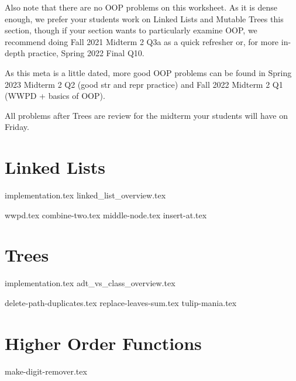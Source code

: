 \documentclass{exam}
\begin{document}
\begin{meta}
    Also note that there are no OOP problems on this worksheet. As it is dense enough, we prefer your students work on Linked Lists and Mutable Trees this section, though if your section wants to particularly examine OOP, we recommend doing Fall 2021 Midterm 2 Q3a as a quick refresher or, for more in-depth practice, Spring 2022 Final Q10.
    
    As this meta is a little dated, more good OOP problems can be found in Spring 2023 Midterm 2 Q2 (good str and repr practice) and Fall 2022 Midterm 2 Q1 (WWPD + basics of OOP).
    
    All problems after Trees are review for the midterm your students will have on Friday.
\end{meta}

\section{Linked Lists}
    {implementation.tex}
    {linked_list_overview.tex}
\begin{questions}
    {wwpd.tex}
    {combine-two.tex}
    {middle-node.tex}
    \newpage
    {insert-at.tex}
\end{questions}

\newpage
\section{Trees}
{implementation.tex}
{adt_vs_class_overview.tex}
\newpage
\begin{questions}
    {delete-path-duplicates.tex}
    \newpage
    {replace-leaves-sum.tex}
    \newpage
    {tulip-mania.tex}
\end{questions}

\section{Higher Order Functions}
\begin{questions}
    {make-digit-remover.tex}
\end{questions}
\end{document}
